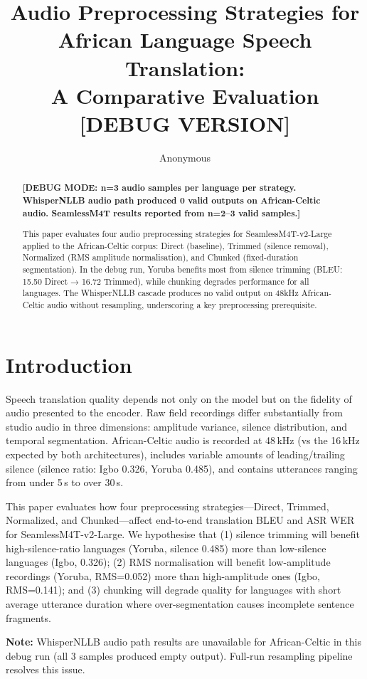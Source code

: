 \documentclass[a4paper]{article}
\title{Audio Preprocessing Strategies for African Language Speech Translation:\\
A Comparative Evaluation [DEBUG VERSION]}
\author{Anonymous}
\date{}
\newcommand{\modelSM}{SeamlessM4T-v2-Large}
\newcommand{\dataAC}{African-Celtic}
\begin{document}
\maketitle

\begin{abstract}
\textbf{[DEBUG MODE: n=3 audio samples per language per strategy. WhisperNLLB audio path produced 0 valid outputs on African-Celtic audio. SeamlessM4T results reported from n=2–3 valid samples.]}

This paper evaluates four audio preprocessing strategies for \modelSM{} applied to the \dataAC{} corpus: Direct (baseline), Trimmed (silence removal), Normalized (RMS amplitude normalisation), and Chunked (fixed-duration segmentation). In the debug run, Yoruba benefits most from silence trimming (BLEU: 15.50 Direct → 16.72 Trimmed), while chunking degrades performance for all languages. The WhisperNLLB cascade produces no valid output on 48kHz African-Celtic audio without resampling, underscoring a key preprocessing prerequisite.
\end{abstract}

\section{Introduction}
\label{sec:intro}

Speech translation quality depends not only on the model but on the fidelity of audio presented to the encoder. Raw field recordings differ substantially from studio audio in three dimensions: amplitude variance, silence distribution, and temporal segmentation. \dataAC{} audio is recorded at 48\,kHz (vs the 16\,kHz expected by both architectures), includes variable amounts of leading/trailing silence (silence ratio: Igbo 0.326, Yoruba 0.485), and contains utterances ranging from under 5\,s to over 30\,s.

This paper evaluates how four preprocessing strategies—Direct, Trimmed, Normalized, and Chunked—affect end-to-end translation BLEU and ASR WER for \modelSM{}. We hypothesise that (1) silence trimming will benefit high-silence-ratio languages (Yoruba, silence 0.485) more than low-silence languages (Igbo, 0.326); (2) RMS normalisation will benefit low-amplitude recordings (Yoruba, RMS=0.052) more than high-amplitude ones (Igbo, RMS=0.141); and (3) chunking will degrade quality for languages with short average utterance duration where over-segmentation causes incomplete sentence fragments.

\textbf{Note:} WhisperNLLB audio path results are unavailable for African-Celtic in this debug run (all 3 samples produced empty output). Full-run resampling pipeline resolves this issue.
\end{document}
